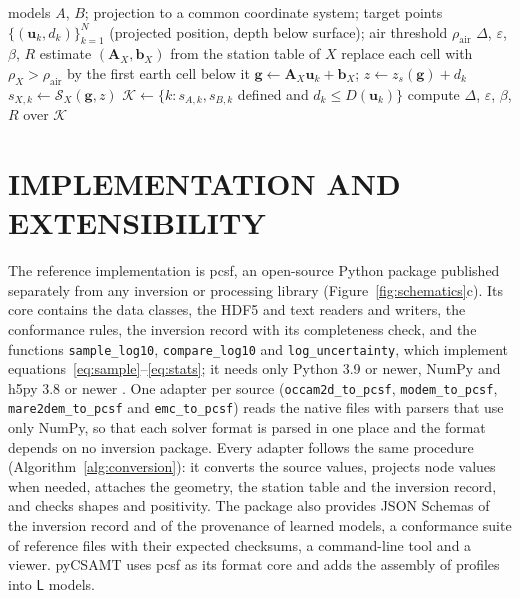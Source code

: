 \documentclass[manuscript]{geophysics}
\newcommand{\code}[1]{\texttt{#1}}
\newcommand{\Lset}{\mathsf{L}}
\begin{document}
\begin{algorithm}[htbp]
\caption{Registration and comparison of two PCSF models.}
\label{alg:compare}
\begin{algorithmic}[1]
\Require models $A$, $B$; projection to a common coordinate system;
  target points $\{(\mathbf{u}_k, d_k)\}_{k=1}^{N}$ (projected position,
  depth below surface); air threshold $\rho_{\mathrm{air}}$
\Ensure $\Delta$, $\varepsilon$, $\beta$, $R$
  \State estimate $(\mathbf{A}_X, \mathbf{b}_X)$ from the station table of $X$
  \State replace each cell with $\rho_X > \rho_{\mathrm{air}}$ by the first earth cell below it
    \State $\mathbf{g} \gets \mathbf{A}_X \mathbf{u}_k + \mathbf{b}_X$;\quad
      $z \gets z_s(\mathbf{g}) + d_k$ 
    \State $s_{X,k} \gets \mathcal{S}_X(\mathbf{g}, z)$ 
  \EndFor
\EndFor
\State $\mathcal{K} \gets \{k : s_{A,k}, s_{B,k}$ defined and $d_k \le D(\mathbf{u}_k)\}$
\State compute $\Delta$, $\varepsilon$, $\beta$, $R$ over $\mathcal{K}$
\end{algorithmic}
\end{algorithm}

\section{IMPLEMENTATION AND EXTENSIBILITY}

The reference implementation is pcsf, an open-source Python package
published separately from any inversion or processing library
(Figure~\ref{fig:schematics}c). Its core contains the data classes,
the HDF5 and text readers and writers, the conformance rules, the
inversion record with its completeness check, and the functions
\code{sample\_log10}, \code{compare\_log10} and
\code{log\_uncertainty}, which implement
equations~\ref{eq:sample}--\ref{eq:stats}; it needs only Python 3.9 or
newer, NumPy and h5py 3.8 or newer \citep{Collette2013}. One adapter
per source (\code{occam2d\_to\_pcsf}, \code{modem\_to\_pcsf},
\code{mare2dem\_to\_pcsf} and \code{emc\_to\_pcsf}) reads the native
files with parsers that use only NumPy, so that each solver format is
parsed in one place and the format depends on no inversion package.
Every adapter follows the same procedure
(Algorithm~\ref{alg:conversion}): it converts the source values,
projects node values when needed, attaches the geometry, the station
table and the inversion record, and checks shapes and positivity. The
package also provides JSON Schemas \citep{Pezoa2016} of the inversion
record and of the provenance of learned models, a conformance suite of
reference files with their expected checksums, a command-line tool and
a viewer. pyCSAMT \citep{Kouadio2022} uses pcsf as its format core and
adds the assembly of profiles into $\Lset$ models.
\end{document}
